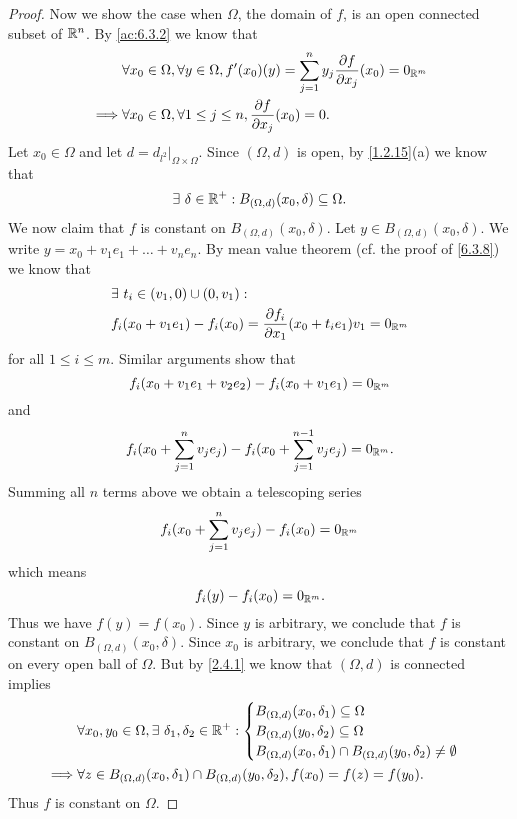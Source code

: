 \begin{proof}
  Now we show the case when \(\Omega\), the domain of \(f\), is an open connected subset of \(\mathbb{R}^n\).
  By \cref{ac:6.3.2} we know that
  \begin{align*}
             & \forall x_0 \in \Omega, \forall y \in \Omega, f'(x_0)(y) = \sum_{j = 1}^n y_j \frac{\partial f}{\partial x_j}(x_0) = 0_{\mathbb{R}^m} \\
    \implies & \forall x_0 \in \Omega, \forall 1 \leq j \leq n, \frac{\partial f}{\partial x_j}(x_0) = 0.
  \end{align*}
  Let \(x_0 \in \Omega\) and let \(d = d_{l^2}|_{\Omega \times \Omega}\).
  Since \((\Omega, d)\) is open, by \cref{1.2.15}(a) we know that
  \[
    \exists\ \delta \in \mathbb{R}^+ : B_{(\Omega, d)}(x_0, \delta) \subseteq \Omega.
  \]
  We now claim that \(f\) is constant on \(B_{(\Omega, d)}(x_0, \delta)\).
  Let \(y \in B_{(\Omega, d)}(x_0, \delta)\).
  We write \(y = x_0 + v_1 e_1 + \dots + v_n e_n\).
  By mean value theorem (cf. the proof of \cref{6.3.8}) we know that
  \begin{align*}
     & \exists\ t_i \in (v_1, 0) \cup (0, v_1) :                                                       \\
     & f_i(x_0 + v_1 e_1) - f_i(x_0) = \frac{\partial f_i}{\partial x_1}(x_0 + t_i e_1) v_1 = 0_{\mathbb{R}^m}
  \end{align*}
  for all \(1 \leq i \leq m\).
  Similar arguments show that
  \[
    f_i(x_0 + v_1 e_1 + v_2 e_2) - f_i(x_0 + v_1 e_1) = 0_{\mathbb{R}^m}
  \]
  and
  \[
    f_i(x_0 + \sum_{j = 1}^n v_j e_j) - f_i(x_0 + \sum_{j = 1}^{n - 1} v_j e_j) = 0_{\mathbb{R}^m}.
  \]
  Summing all \(n\) terms above we obtain a telescoping series
  \[
    f_i(x_0 + \sum_{j = 1}^n v_j e_j) - f_i(x_0) = 0_{\mathbb{R}^m}
  \]
  which means
  \[
    f_i(y) - f_i(x_0) = 0_{\mathbb{R}^m}.
  \]
  Thus we have \(f(y) = f(x_0)\).
  Since \(y\) is arbitrary, we conclude that \(f\) is constant on \(B_{(\Omega, d)}(x_0, \delta)\).
  Since \(x_0\) is arbitrary, we conclude that \(f\) is constant on every open ball of \(\Omega\).
  But by \cref{2.4.1} we know that \((\Omega, d)\) is connected implies
  \begin{align*}
             & \forall x_0, y_0 \in \Omega, \exists\ \delta_1, \delta_2 \in \mathbb{R}^+ : \begin{cases}
                                                                                     B_{(\Omega, d)}(x_0, \delta_1) \subseteq \Omega \\
                                                                                     B_{(\Omega, d)}(y_0, \delta_2) \subseteq \Omega \\
                                                                                     B_{(\Omega, d)}(x_0, \delta_1) \cap B_{(\Omega, d)}(y_0, \delta_2) \neq \emptyset
                                                                                   \end{cases} \\
    \implies & \forall z \in B_{(\Omega, d)}(x_0, \delta_1) \cap B_{(\Omega, d)}(y_0, \delta_2), f(x_0) = f(z) = f(y_0).
  \end{align*}
  Thus \(f\) is constant on \(\Omega\).
\end{proof}